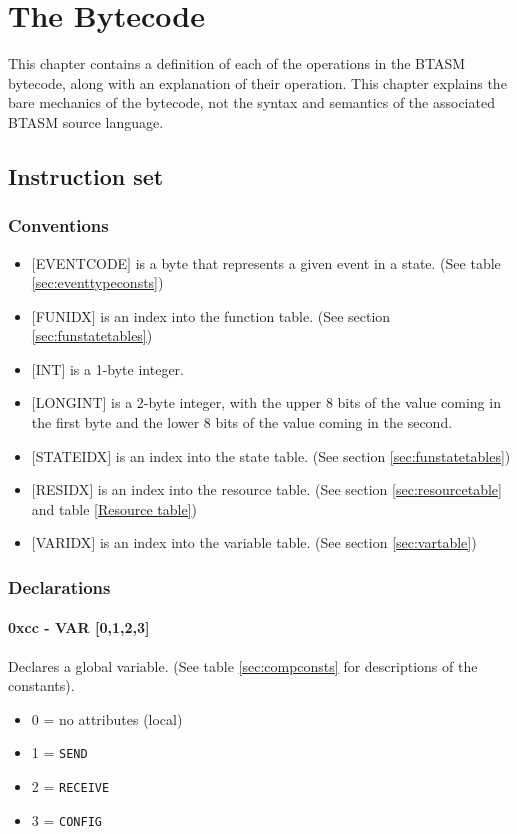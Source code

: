 \documentclass[12pt,a4paper]{scrbook}
\begin{document}
\chapter{The Bytecode}
This chapter contains a definition of each of the operations in the BTASM bytecode, along with an
explanation of their operation.  This chapter explains the bare mechanics of the bytecode, not
the syntax and semantics of the associated BTASM source language.  

\section{Instruction set}

\subsection{Conventions}
\begin{itemize}
\item $[$EVENTCODE$]$ is a byte that represents a given event in a state. (See 
		table \ref{sec:eventtypeconsts})
\item $[$FUNIDX$]$ is an index into the function table. (See section \ref{sec:funstatetables})
\item $[$INT$]$ is a 1-byte integer.  
\item $[$LONGINT$]$ is a 2-byte integer, with the upper 8 bits of the value coming in the first byte 
		and the lower 8 bits of the value coming in the second.
\item $[$STATEIDX$]$ is an index into the state table. (See section \ref{sec:funstatetables})
\item $[$RESIDX$]$ is an index into the resource table. (See section \ref{sec:resourcetable} and 
		table \ref{Resource table})
\item $[$VARIDX$]$ is an index into the variable table. (See section \ref{sec:vartable})
\end{itemize}



\subsection{Declarations}

\subsubsection{0xcc - VAR [0,1,2,3]} 
Declares a global variable.  (See table \ref{sec:compconsts} for descriptions of the constants).
\begin{itemize}
\item 0 = no attributes (local)
\item 1 = \texttt{SEND}
\item 2 = \texttt{RECEIVE}
\item 3 = \texttt{CONFIG}
\end{itemize}
\end{document}
